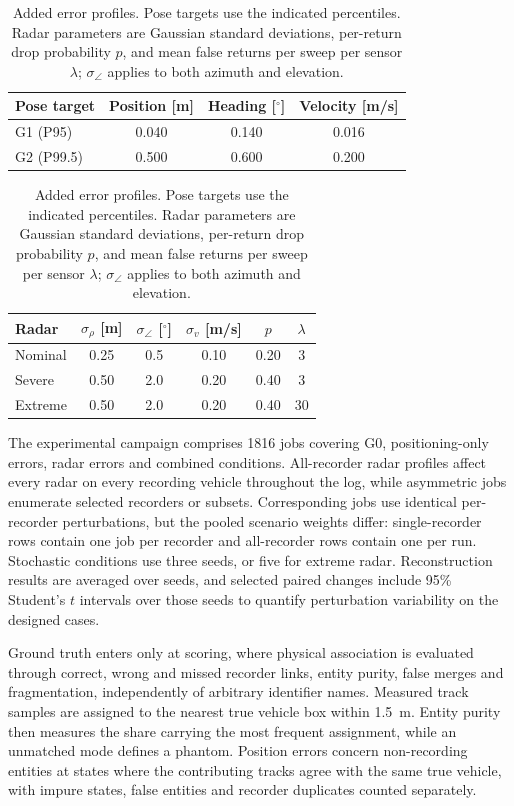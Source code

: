 \begin{table}[!t]
\caption{Added error profiles. Pose targets use the indicated percentiles.
Radar parameters are Gaussian standard deviations, per-return drop
probability $p$, and mean false returns per sweep per sensor $\lambda$;
$\sigma_{\angle}$ applies to both azimuth and elevation.}
\label{tab:profiles}
\centering
\footnotesize
\setlength{\tabcolsep}{3pt}
\begin{tabular*}{\columnwidth}{@{\extracolsep{\fill}}lccc@{}}
\hline
\textbf{Pose target} & \textbf{Position [m]} & \textbf{Heading [$^\circ$]} & \textbf{Velocity [m/s]} \\
\hline
G1 (P95) & 0.040 & 0.140 & 0.016 \\
G2 (P99.5) & 0.500 & 0.600 & 0.200 \\
\hline
\end{tabular*}
\smallskip
\begin{tabular*}{\columnwidth}{@{\extracolsep{\fill}}lccccc@{}}
\hline
\textbf{Radar} & $\sigma_\rho$ [m] & $\sigma_{\angle}$ [$^\circ$] & $\sigma_v$ [m/s] & $p$ & $\lambda$ \\
\hline
Nominal & 0.25 & 0.5 & 0.10 & 0.20 & 3 \\
Severe  & 0.50 & 2.0 & 0.20 & 0.40 & 3 \\
Extreme & 0.50 & 2.0 & 0.20 & 0.40 & 30 \\
\hline
\end{tabular*}
\end{table}

The experimental campaign comprises 1816 jobs covering G0,
positioning-only errors, radar errors and combined conditions.
All-recorder radar profiles affect every radar on every recording vehicle
throughout the log, while asymmetric jobs enumerate selected recorders
or subsets. Corresponding jobs use identical per-recorder perturbations,
but the pooled scenario weights differ: single-recorder rows contain one
job per recorder and all-recorder rows contain one per run. Stochastic
conditions use three seeds, or five for extreme radar. Reconstruction
results are averaged over seeds, and selected paired changes include
95\% Student's $t$ intervals over those seeds to quantify perturbation
variability on the designed cases.

Ground truth enters only at scoring, where physical association is
evaluated through correct, wrong and missed recorder links, entity
purity, false merges and fragmentation, independently of arbitrary
identifier names. Measured track samples are assigned to the nearest true
vehicle box within 1.5~m. Entity purity then measures the share carrying
the most frequent assignment, while an unmatched mode defines a phantom.
Position errors concern non-recording entities at states where the
contributing tracks agree with the same true vehicle, with impure states,
false entities and recorder duplicates counted separately.

